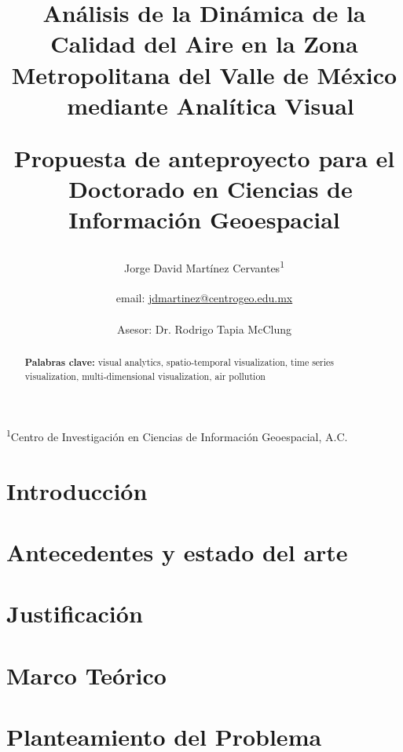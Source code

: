 \documentclass[12pt]{article}
\title{\renewcommand{\baselinestretch}{1.17}\bf%
Análisis de la Dinámica de la Calidad del Aire en la Zona Metropolitana del Valle de México \ 
mediante Analítica Visual \\

\begin{large} 
    Propuesta de anteproyecto para el \ 
    Doctorado en Ciencias de Información Geoespacial
\end{large}
}
\author{%
Jorge David Martínez Cervantes\textsuperscript{1} \\ 
\\ 
\normalsize email: \href{mailto:jdmartinez@centrogeo.edu.mx}{jdmartinez@centrogeo.edu.mx} \\
\\ 

Asesor: Dr. Rodrigo Tapia McClung
}
\date{\vspace{-5ex}}
\begin{document}
\maketitle

\begin{center}
    {\footnotesize 
    \textsuperscript{1}Centro de Investigación en Ciencias de Información Geoespacial, A.C. \\
    }
\end{center}

\newpage

\tableofcontents

\newpage

\begin{abstract}
	
    \textbf{Palabras clave:} visual analytics, spatio-temporal visualization, time series visualization, multi-dimensional visualization, air pollution \\

\end{abstract}

\newpage

\section{Introducción}\label{sec:introduccion}

% 

\section{Antecedentes y estado del arte}\label{sec:antecedentes}

% 

\section{Justificación}\label{sec:justificacion}

% 

\section{Marco Teórico}\label{sec:marco_teorico}



\section{Planteamiento del Problema}\label{sec:planteamiento}
\end{document}
